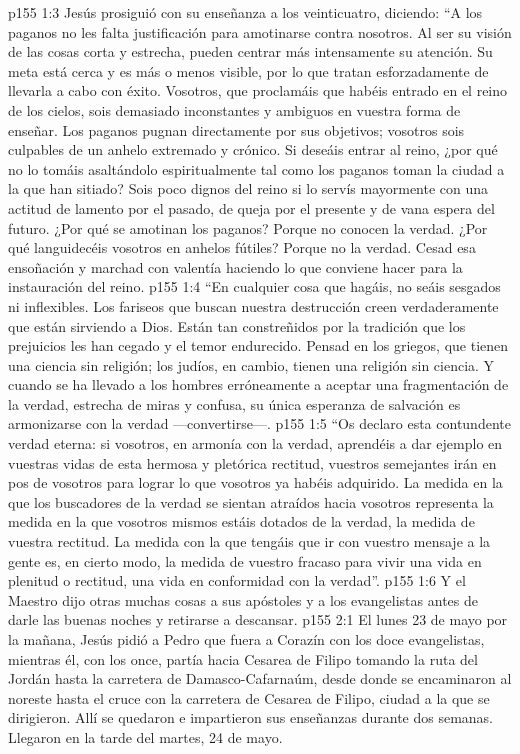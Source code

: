 \vs p155 1:3 Jesús prosiguió con su enseñanza a los veinticuatro, diciendo: “A los paganos no les falta justificación para amotinarse contra nosotros. Al ser su visión de las cosas corta y estrecha, pueden centrar más intensamente su atención. Su meta está cerca y es más o menos visible, por lo que tratan esforzadamente de llevarla a cabo con éxito. Vosotros, que proclamáis que habéis entrado en el reino de los cielos, sois demasiado inconstantes y ambiguos en vuestra forma de enseñar. Los paganos pugnan directamente por sus objetivos; vosotros sois culpables de un anhelo extremado y crónico. Si deseáis entrar al reino, ¿por qué no lo tomáis asaltándolo espiritualmente tal como los paganos toman la ciudad a la que han sitiado? Sois poco dignos del reino si lo servís mayormente con una actitud de lamento por el pasado, de queja por el presente y de vana espera del futuro. ¿Por qué se amotinan los paganos? Porque no conocen la verdad. ¿Por qué languidecéis vosotros en anhelos fútiles? Porque no  la verdad. Cesad esa ensoñación y marchad con valentía haciendo lo que conviene hacer para la instauración del reino.
\vs p155 1:4 “En cualquier cosa que hagáis, no seáis sesgados ni inflexibles. Los fariseos que buscan nuestra destrucción creen verdaderamente que están sirviendo a Dios. Están tan constreñidos por la tradición que los prejuicios les han cegado y el temor endurecido. Pensad en los griegos, que tienen una ciencia sin religión; los judíos, en cambio, tienen una religión sin ciencia. Y cuando se ha llevado a los hombres erróneamente a aceptar una fragmentación de la verdad, estrecha de miras y confusa, su única esperanza de salvación es armonizarse con la verdad ---convertirse---.
\vs p155 1:5 “Os declaro esta contundente verdad eterna: si vosotros, en armonía con la verdad, aprendéis a dar ejemplo en vuestras vidas de esta hermosa y pletórica rectitud, vuestros semejantes irán en pos de vosotros para lograr lo que vosotros ya habéis adquirido. La medida en la que los buscadores de la verdad se sientan atraídos hacia vosotros representa la medida en la que vosotros mismos estáis dotados de la verdad, la medida de vuestra rectitud. La medida con la que tengáis que ir con vuestro mensaje a la gente es, en cierto modo, la medida de vuestro fracaso para vivir una vida en plenitud o rectitud, una vida en conformidad con la verdad”.
\vs p155 1:6 Y el Maestro dijo otras muchas cosas a sus apóstoles y a los evangelistas antes de darle las buenas noches y retirarse a descansar.
\vs p155 2:1 El lunes 23 de mayo por la mañana, Jesús pidió a Pedro que fuera a Corazín con los doce evangelistas, mientras él, con los once, partía hacia Cesarea de Filipo tomando la ruta del Jordán hasta la carretera de Damasco\hyp{}Cafarnaúm, desde donde se encaminaron al noreste hasta el cruce con la carretera de Cesarea de Filipo, ciudad a la que se dirigieron. Allí se quedaron e impartieron sus enseñanzas durante dos semanas. Llegaron en la tarde del martes, 24 de mayo.
